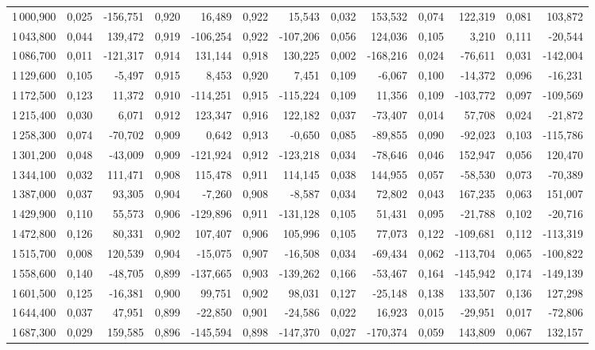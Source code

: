 \begin{longtable}{rrrrrrrrrrrrr}
1\,000,900 & 0,025 & -156,751 & 0,920 & 16,489 & 0,922 & 15,543 & 0,032 & 153,532 & 0,074 & 122,319 & 0,081 & 103,872\\
1\,043,800 & 0,044 & 139,472 & 0,919 & -106,254 & 0,922 & -107,206 & 0,056 & 124,036 & 0,105 & 3,210 & 0,111 & -20,544\\
1\,086,700 & 0,011 & -121,317 & 0,914 & 131,144 & 0,918 & 130,225 & 0,002 & -168,216 & 0,024 & -76,611 & 0,031 & -142,004\\
1\,129,600 & 0,105 & -5,497 & 0,915 & 8,453 & 0,920 & 7,451 & 0,109 & -6,067 & 0,100 & -14,372 & 0,096 & -16,231\\
1\,172,500 & 0,123 & 11,372 & 0,910 & -114,251 & 0,915 & -115,224 & 0,109 & 11,356 & 0,109 & -103,772 & 0,097 & -109,569\\
1\,215,400 & 0,030 & 6,071 & 0,912 & 123,347 & 0,916 & 122,182 & 0,037 & -73,407 & 0,014 & 57,708 & 0,024 & -21,872\\
1\,258,300 & 0,074 & -70,702 & 0,909 & 0,642 & 0,913 & -0,650 & 0,085 & -89,855 & 0,090 & -92,023 & 0,103 & -115,786\\
1\,301,200 & 0,048 & -43,009 & 0,909 & -121,924 & 0,912 & -123,218 & 0,034 & -78,646 & 0,046 & 152,947 & 0,056 & 120,470\\
1\,344,100 & 0,032 & 111,471 & 0,908 & 115,478 & 0,911 & 114,145 & 0,038 & 144,955 & 0,057 & -58,530 & 0,073 & -70,389\\
1\,387,000 & 0,037 & 93,305 & 0,904 & -7,260 & 0,908 & -8,587 & 0,034 & 72,802 & 0,043 & 167,235 & 0,063 & 151,007\\
1\,429,900 & 0,110 & 55,573 & 0,906 & -129,896 & 0,911 & -131,128 & 0,105 & 51,431 & 0,095 & -21,788 & 0,102 & -20,716\\
1\,472,800 & 0,126 & 80,331 & 0,902 & 107,407 & 0,906 & 105,996 & 0,105 & 77,073 & 0,122 & -109,681 & 0,112 & -113,319\\
1\,515,700 & 0,008 & 120,539 & 0,904 & -15,075 & 0,907 & -16,508 & 0,034 & -69,434 & 0,062 & -113,704 & 0,065 & -100,822\\
1\,558,600 & 0,140 & -48,705 & 0,899 & -137,665 & 0,903 & -139,262 & 0,166 & -53,467 & 0,164 & -145,942 & 0,174 & -149,139\\
1\,601,500 & 0,125 & -16,381 & 0,900 & 99,751 & 0,902 & 98,031 & 0,127 & -25,148 & 0,138 & 133,507 & 0,136 & 127,298\\
1\,644,400 & 0,037 & 47,951 & 0,899 & -22,850 & 0,901 & -24,586 & 0,022 & 16,923 & 0,015 & -29,951 & 0,017 & -72,806\\
1\,687,300 & 0,029 & 159,585 & 0,896 & -145,594 & 0,898 & -147,370 & 0,027 & -170,374 & 0,059 & 143,809 & 0,067 & 132,157\\

\end{longtable}
